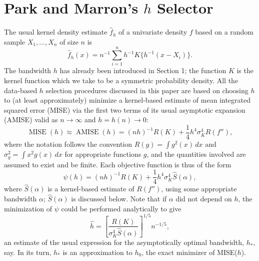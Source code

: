 \documentclass[11pt]{article}
\newcommand{\MISE}{\operatorname{MISE}}
\newcommand{\fhat}{\widehat f}
\begin{document}
\section{Park and Marron's $h$ Selector}
The usual kernel density estimate $\fhat_h$ of a univariate density $f$ based on a random sample $X_1,\ldots,X_n$ of size $n$ is
\begin{equation}
\fhat_h(x)=n^{-1}\sum_{i=1}^n h^{-1}K\{h^{-1}(x-X_i)\}.
\tag{1}
\end{equation}
The bandwidth $h$ has already been introduced in Section 1; the function $K$ is the kernel function which we take to be a symmetric probability density. All the data-based $h$ selection procedures discussed in this paper are based on choosing $h$ to (at least approximately) minimize a kernel-based estimate of mean integrated squared error (MISE) via the first two terms of its usual asymptotic expansion (AMISE) valid as $n\to\infty$ and $h=h(n)\to0$:
\begin{equation}
\MISE(h)\approx\operatorname{AMISE}(h)=(nh)^{-1}R(K)+\frac14h^4\sigma_K^4R(f''),
\tag{2}
\end{equation}
where the notation follows the convention $R(g)=\int g^2(x)\,dx$ and $\sigma_g^2=\int x^2g(x)\,dx$ for appropriate functions $g$, and the quantities involved are assumed to exist and be finite. Each objective function is thus of the form
\begin{equation}
\psi(h)=(nh)^{-1}R(K)+\frac14h^4\sigma_K^4\widehat S(\alpha),
\tag{3}
\end{equation}
where $\widehat S(\alpha)$ is a kernel-based estimate of $R(f'')$, using some appropriate bandwidth $\alpha$; $\widehat S(\alpha)$ is discussed below. Note that if $\alpha$ did not depend on $h$, the minimization of $\psi$ could be performed analytically to give
\begin{equation}
\widehat h=\left[\frac{R(K)}{\sigma_K^4\widehat S(\alpha)}\right]^{1/5}n^{-1/5},
\tag{4}
\end{equation}
an estimate of the usual expression for the asymptotically optimal bandwidth, $h_*$, say. In its turn, $h_*$ is an approximation to $h_0$, the exact minimizer of MISE($h$).
\end{document}
